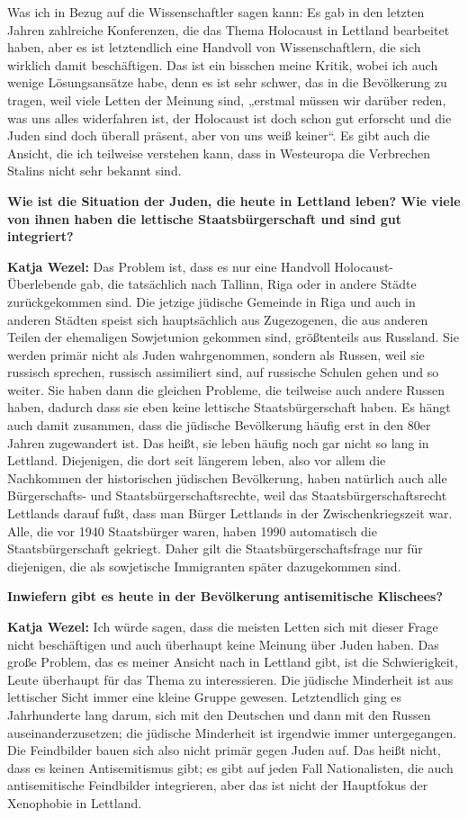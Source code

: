 Was ich in Bezug auf die Wissenschaftler sagen kann: Es gab in den letzten Jahren zahlreiche Konferenzen, die das Thema Holocaust in Lettland bearbeitet haben, aber es ist letztendlich eine Handvoll von Wissenschaftlern, die sich wirklich damit beschäftigen. Das ist ein bisschen meine Kritik, wobei ich auch wenige Lösungsansätze habe, denn es ist sehr schwer, das in die Bevölkerung zu tragen, weil viele Letten der Meinung sind, „erstmal müssen wir darüber reden, was uns alles widerfahren ist, der Holocaust ist doch schon gut erforscht und die Juden sind doch überall präsent, aber von uns weiß keiner“. Es gibt auch die Ansicht, die ich teilweise verstehen kann, dass in Westeuropa die Verbrechen Stalins nicht sehr bekannt sind. 

\textbf{Wie ist die Situation der Juden, die heute in Lettland leben? Wie viele von ihnen haben die lettische Staatsbürgerschaft und sind gut integriert?} 

\textbf{Katja Wezel:} Das Problem ist, dass es nur eine Handvoll Holocaust-Überlebende gab, die tatsächlich nach Tallinn, Riga oder in andere Städte zurückgekommen sind. Die jetzige jüdische Gemeinde in Riga und auch in anderen Städten speist sich hauptsächlich aus Zugezogenen, die aus anderen Teilen der ehemaligen Sowjetunion gekommen sind, größtenteils aus Russland. Sie werden primär nicht als Juden wahrgenommen, sondern als Russen, weil sie russisch sprechen, russisch assimiliert sind, auf russische Schulen gehen und so weiter. Sie haben dann die gleichen Probleme, die teilweise auch andere Russen haben, dadurch dass sie eben keine lettische Staatsbürgerschaft haben. Es hängt auch damit zusammen, dass die jüdische Bevölkerung häufig erst in den 80er Jahren zugewandert ist. Das heißt, sie leben häufig noch gar nicht so lang in Lettland. Diejenigen, die dort seit längerem leben, also vor allem die Nachkommen der historischen jüdischen Bevölkerung, haben natürlich auch alle Bürgerschafts- und Staatsbürgerschaftsrechte, weil das Staatsbürgerschaftsrecht Lettlands darauf fußt, dass man Bürger Lettlands in der Zwischenkriegszeit war. Alle, die vor 1940 Staatsbürger waren, haben 1990 automatisch die Staatsbürgerschaft gekriegt. Daher gilt die Staatsbürgerschaftsfrage nur für diejenigen, die als sowjetische Immigranten später dazugekommen sind. 

\textbf{Inwiefern gibt es heute in der Bevölkerung antisemitische Klischees?} 

\textbf{Katja Wezel:} Ich würde sagen, dass die meisten Letten sich mit dieser Frage nicht beschäftigen und auch überhaupt keine Meinung über Juden haben. Das große Problem, das es meiner Ansicht nach in Lettland gibt, ist die Schwierigkeit, Leute überhaupt für das Thema zu interessieren. Die jüdische Minderheit ist aus lettischer Sicht immer eine kleine Gruppe gewesen. Letztendlich ging es Jahrhunderte lang darum, sich mit den Deutschen und dann mit den Russen auseinanderzusetzen; die jüdische Minderheit ist irgendwie immer untergegangen. Die Feindbilder bauen sich also nicht primär gegen Juden auf. Das heißt nicht, dass es keinen Antisemitismus gibt; es gibt auf jeden Fall Nationalisten, die auch antisemitische Feindbilder integrieren, aber das ist nicht der Hauptfokus der Xenophobie in Lettland. 

